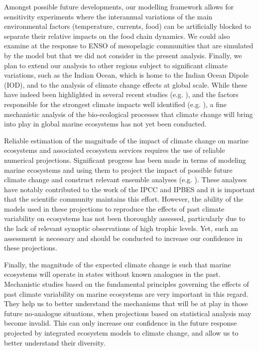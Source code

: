 Amongst possible future developments, our modelling framework allows for sensitivity experiments where the interannual variations of the main environmental factors (temperature, currents, food) can be artificially blocked to separate their relative impacts on the food chain dynamics. We could also examine at the response to ENSO of mesopelagic communities that are simulated by the model but that we did not consider in the present analysis. Finally, we plan to extend our analysis to other regions subject to significant climate variations, such as the Indian Ocean, which is home to the Indian Ocean Dipole (IOD), and to the analysis of climate change effects at global scale. While these have indeed been highlighted in several recent studies (e.g. \citealp{lotzeGlobalEnsembleProjections2019, tittensorNextgenerationEnsembleProjections2021}), and the factors responsible for the strongest climate impacts well identified (e.g. \citealp{heneghanDisentanglingDiverseResponses2021}), a fine mechanistic analysis of the bio-ecological processes that climate change will bring into play in global marine ecosystems has not yet been conducted.

Reliable estimation of the magnitude of the impact of climate change on marine ecosystems and associated ecosystem services requires the use of reliable numerical projections. Significant progress has been made in terms of modeling marine ecosystems and using them to project the impact of possible future climate change and construct relevant ensemble analyses (e.g. \citealp{lotzeGlobalEnsembleProjections2019, tittensorNextgenerationEnsembleProjections2021}). These analyses have notably contributed to the work of the IPCC \citep{portnerIPCCSpecialReport2019, portnerClimateChange20222022} and IPBES \citep{brondizioGlobalAssessmentReport2019} and it is important that the scientific community maintains this effort. However, the ability of the models used in these projections to reproduce the effects of past climate variability on ecosystems has not been thoroughly assessed, particularly due to the lack of relevant synoptic observations of high trophic levels. Yet, such an assessment is necessary and should be conducted to increase our confidence in these projections.

Finally, the magnitude of the expected climate change is such that marine ecosystems will operate in states without known analogues in the past. Mechanistic studies based on the fundamental principles governing the effects of past climate variability on marine ecosystems are very important in this regard. They help us to better understand the mechanisms that will be at play in those future no-analogue situations, when projections based on statistical analysis may become invalid. This can only increase our confidence in the future response projected by integrated ecosystem models to climate change, and allow us to better understand their diversity.